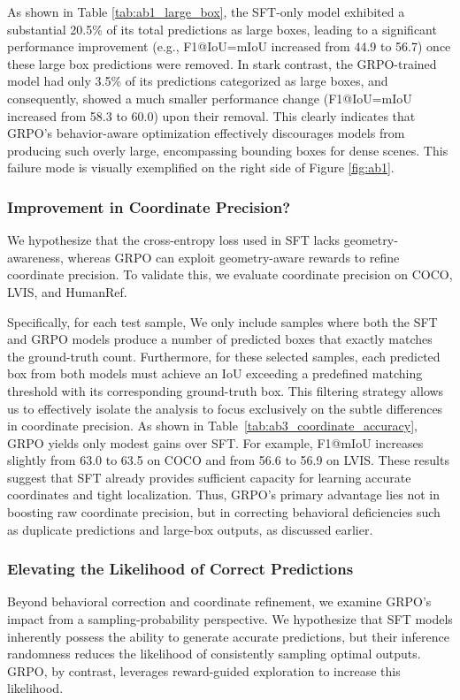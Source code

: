 As shown in Table \ref{tab:ab1_large_box}, the SFT-only model exhibited a substantial 20.5\% of its total predictions as large boxes, leading to a significant performance improvement (e.g., F1@IoU=mIoU increased from 44.9 to 56.7) once these large box predictions were removed. In stark contrast, the GRPO-trained model had only 3.5\% of its predictions categorized as large boxes, and consequently, showed a much smaller performance change (F1@IoU=mIoU increased from 58.3 to 60.0) upon their removal. This clearly indicates that GRPO's behavior-aware optimization effectively discourages models from producing such overly large, encompassing bounding boxes for dense scenes. This failure mode is visually exemplified on the right side of Figure \ref{fig:ab1}.

\subsubsection{Improvement in Coordinate Precision?}
We hypothesize that the cross-entropy loss used in SFT lacks geometry-awareness, whereas GRPO can exploit geometry-aware rewards to refine coordinate precision. To validate this, we evaluate coordinate precision on COCO, LVIS, and HumanRef.

Specifically, for each test sample, We only include samples where both the SFT and GRPO models produce a number of predicted boxes that exactly matches the ground-truth count. Furthermore, for these selected samples, each predicted box from both models must achieve an IoU exceeding a predefined matching threshold with its corresponding ground-truth box. This filtering strategy allows us to effectively isolate the analysis to focus exclusively on the subtle differences in coordinate precision. As shown in Table~\ref{tab:ab3_coordinate_accuracy}, GRPO yields only modest gains over SFT. For example, F1@mIoU increases slightly from 63.0 to 63.5 on COCO and from 56.6 to 56.9 on LVIS. These results suggest that SFT already provides sufficient capacity for learning accurate coordinates and tight localization. Thus, GRPO’s primary advantage lies not in boosting raw coordinate precision, but in correcting behavioral deficiencies such as duplicate predictions and large-box outputs, as discussed earlier.





\subsubsection{\textbf{Elevating the Likelihood of Correct Predictions}}
Beyond behavioral correction and coordinate refinement, we examine GRPO’s impact from a sampling-probability perspective. We hypothesize that SFT models inherently possess the ability to generate accurate predictions, but their inference randomness reduces the likelihood of consistently sampling optimal outputs. GRPO, by contrast, leverages reward-guided exploration to increase this likelihood.


